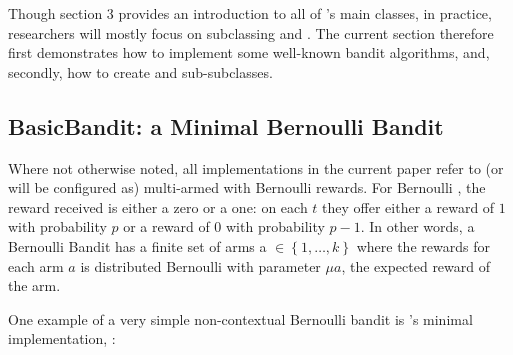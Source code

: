\documentclass{jss}\usepackage[]{graphicx}\usepackage[]{color}
\begin{document}
Though section 3 provides an introduction to all of 's main classes, in practice, researchers will mostly focus on subclassing  and . The current section therefore first demonstrates how to implement some well-known bandit algorithms, and, secondly, how to create  and  sub-subclasses.

\subsection{BasicBandit: a Minimal Bernoulli Bandit}

Where not otherwise noted, all  implementations in the current paper refer to (or will be configured as) multi-armed  with Bernoulli rewards. For Bernoulli , the reward received is either a zero or a one: on each $t$ they offer either a reward of $1$ with probability $p$ or a reward of $0$ with probability $p - 1$. In other words, a Bernoulli Bandit has a finite set of arms a \(  \in \left\{ 1, \dots, k \right\} \) where the rewards for each arm $a$ is distributed Bernoulli with parameter ${\mu}a$, the expected reward of the arm.

One example of a very simple non-contextual Bernoulli bandit is 's minimal  implementation, :
\end{document}
